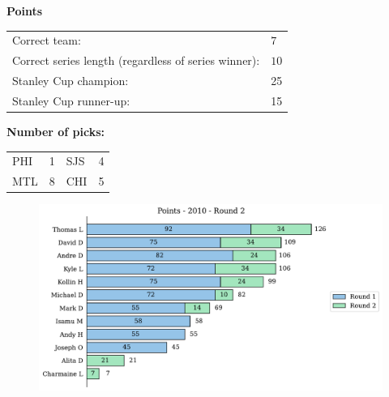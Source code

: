 \documentclass[10pt]{article}
\begin{document}
{\bf Points}\\
\begin{minipage}{12cm}
    \begin{tabular}{l l}
        Correct team:	& $7$\\
        Correct series length (regardless of series winner):	& $10$\\
        Stanley Cup champion:	& 25\\
        Stanley Cup runner-up:	& 15\\
    \end{tabular}

    \vspace{1cm}
    {\bf Number of picks:}\\
    \begin{tabular}{lc | lc }
        PHI & 1 & SJS & 4 \\
        MTL & 8 & CHI & 5 \\
    \end{tabular}
\end{minipage}
\begin{minipage}[t]{13cm}
    \begin{figure}[H]
        \vspace{-3.5cm}
        \includegraphics[width=12cm]{../../figures/2010/Points-2010-Round2.pdf}
    \end{figure}
\end{minipage}
\end{document}
